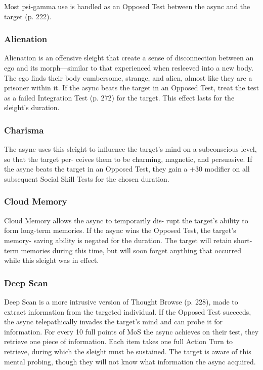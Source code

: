Most psi-gamma use is handled as an Opposed Test 
between the async and the target (p. 222).

\subsubsection{Alienation}

Alienation is an offensive sleight that create a sense of 
disconnection between an ego and its morph—similar 
to that experienced when resleeved into a new body. 
The ego finds their body cumbersome, strange, and 
alien, almost like they are a prisoner within it. If the 
async beats the target in an Opposed Test, treat the 
test as a failed Integration Test (p. 272) for the target. 
This effect lasts for the sleight's duration.

\subsubsection{Charisma}

The async uses this sleight to influence the target's 
mind on a subconscious level, so that the target per-
ceives them to be charming, magnetic, and persuasive. 
If the async beats the target in an Opposed Test, they 
gain a +30 modifier on all subsequent Social Skill 
Tests for the chosen duration.

\subsubsection{Cloud Memory}

Cloud Memory allows the async to temporarily dis-
rupt the target's ability to form long-term memories. If 
the async wins the Opposed Test, the target's memory-
saving ability is negated for the duration. The target 
will retain short-term memories during this time, but 
will soon forget anything that occurred while this 
sleight was in effect.

\subsubsection{Deep Scan}

Deep Scan is a more intrusive version of Thought 
Browse (p. 228), made to extract information from the 
targeted individual. If the Opposed Test succeeds, the 
async telepathically invades the target's mind and can 
probe it for information. For every 10 full points of MoS 
the async achieves on their test, they retrieve one piece 
of information. Each item takes one full Action Turn to 
retrieve, during which the sleight must be sustained. The 
target is aware of this mental probing, though they will 
not know what information the async acquired.

